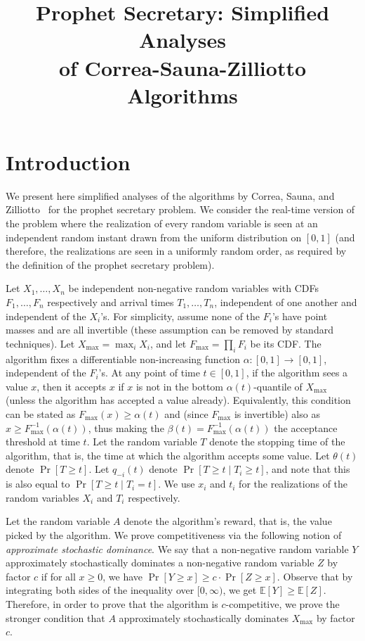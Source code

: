 \documentclass[10pt, letterpaper, twoside]{article}
\title{Prophet Secretary: Simplified Analyses\\ of Correa-Sauna-Zilliotto Algorithms}
\begin{document}
\maketitle

\section{Introduction}

We present here simplified analyses of the algorithms by Correa, Sauna, and Zilliotto~\cite{CorreaSZ19} for the prophet secretary problem. We consider the real-time version of the problem where the realization of every random variable is seen at an independent random instant drawn from the uniform distribution on $[0,1]$ (and therefore, the realizations are seen in a uniformly random order, as required by the definition of the prophet secretary problem).

Let $X_1,\ldots,X_n$ be independent non-negative random variables with CDFs $F_1,\ldots,F_n$ respectively and arrival times $T_1,\ldots,T_n$, independent of one another and independent of the $X_i$'s. For simplicity, assume none of the $F_i$'s have point masses and are all invertible (these assumption can be removed by standard techniques). Let $X_{\max}=\max_iX_i$, and let $F_{\max}=\prod_iF_i$ be its CDF. The algorithm fixes a differentiable non-increasing function $\alpha:[0,1]\longrightarrow[0,1]$, independent of the $F_i$'s. At any point of time $t\in[0,1]$, if the algorithm sees a value $x$, then it accepts $x$ if $x$ is not in the bottom $\alpha(t)$-quantile of $X_{\max}$ (unless the algorithm has accepted a value already). Equivalently, this condition can be stated as $F_{\max}(x)\geq\alpha(t)$ and (since $F_{\max}$ is invertible) also as $x\geq F_{\max}^{-1}(\alpha(t))$, thus making the $\beta(t)=F_{\max}^{-1}(\alpha(t))$ the acceptance threshold at time $t$. Let the random variable $T$ denote the stopping time of the algorithm, that is, the time at which the algorithm accepts some value. Let $\theta(t)$ denote $\Pr[T\geq t]$. Let $q_{-i}(t)$ denote $\Pr[T\geq t\mid T_i\geq t]$, and note that this is also equal to $\Pr[T\geq t\mid T_i=t]$. We use $x_i$ and $t_i$ for the realizations of the random variables $X_i$ and $T_i$ respectively.

Let the random variable $A$ denote the algorithm's reward, that is, the value picked by the algorithm. We prove competitiveness via the following notion of \textit{approximate stochastic dominance}. We say that a non-negative random variable $Y$ approximately stochastically dominates a non-negative random variable $Z$ by factor $c$ if for all $x\geq0$, we have $\Pr[Y\geq x]\geq c\cdot\Pr[Z\geq x]$. Observe that by integrating both sides of the inequality over $[0,\infty)$, we get $\mathbb{E}[Y]\geq\mathbb{E}[Z]$. Therefore, in order to prove that the algorithm is $c$-competitive, we prove the stronger condition that $A$ approximately stochastically dominates $X_{\max}$ by factor $c$.
\end{document}
